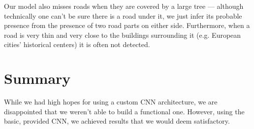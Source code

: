 \documentclass[11pt,conference,compsocconf]{IEEEtran}
\begin{document}
Our model also misses roads when they are covered by a large tree --- although technically one can't be sure there is a road under it, we just infer its probable presence from the presence of two road parts on either side. Furthermore, when a road is very thin and very close to the buildings surrounding it (e.g. European cities' historical centers) it is often not detected.

\section{Summary}
While we had high hopes for using a custom CNN architecture, we are disappointed that we weren't able to build a functional one. However, using the basic, provided CNN, we achieved results that we would deem satisfactory.
\end{document}
